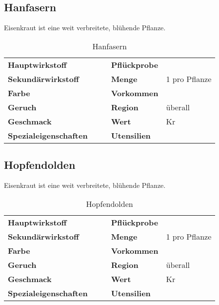 \subsection{Hanfasern}
Eisenkraut ist eine weit verbreitete, blühende Pflanze. 

\begin{table}[h]
\begin{center}
\begin{tabular}{|l|l|p{1cm}|l|l|}
	\cline{1-2} \cline{4-5}
	\textbf{Hauptwirkstoff} &  && \textbf{Pflückprobe} &  \\ \cline{1-2} \cline{4-5}
	\textbf{Sekundärwirkstoff} &  && \textbf{Menge} & 1 pro Pflanze \\ \cline{1-2} \cline{4-5}
	\textbf{Farbe} &  && \textbf{Vorkommen} &  \\ \cline{1-2} \cline{4-5}
	\textbf{Geruch} &  && \textbf{Region} & überall \\ \cline{1-2} \cline{4-5}
	\textbf{Geschmack} &  && \textbf{Wert} & Kr \\ \cline{1-2} \cline{4-5}
	\textbf{Spezialeigenschaften} &  && \textbf{Utensilien} &  \\ \cline{1-2} \cline{4-5}
\end{tabular}
\end{center}
\caption{Hanfasern}
\label{tab:hanfasern}
\end{table}


\subsection{Hopfendolden}
Eisenkraut ist eine weit verbreitete, blühende Pflanze. 

\begin{table}[h]
\begin{center}
\begin{tabular}{|l|l|p{1cm}|l|l|}
	\cline{1-2} \cline{4-5}
	\textbf{Hauptwirkstoff} &  && \textbf{Pflückprobe} &  \\ \cline{1-2} \cline{4-5}
	\textbf{Sekundärwirkstoff} &  && \textbf{Menge} & 1 pro Pflanze \\ \cline{1-2} \cline{4-5}
	\textbf{Farbe} &  && \textbf{Vorkommen} &  \\ \cline{1-2} \cline{4-5}
	\textbf{Geruch} &  && \textbf{Region} & überall \\ \cline{1-2} \cline{4-5}
	\textbf{Geschmack} &  && \textbf{Wert} & Kr \\ \cline{1-2} \cline{4-5}
	\textbf{Spezialeigenschaften} &  && \textbf{Utensilien} &  \\ \cline{1-2} \cline{4-5}
\end{tabular}
\end{center}
\caption{Hopfendolden}
\label{tab:hopfendolden}
\end{table}


